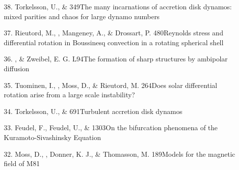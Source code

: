 \begin{itemize}
\item[38.]
Torkelsson, U., \& \Brandenburg{}
{349}{The many incarnations of accretion disk dynamos:
mixed parities and chaos for large dynamo numbers}

\item[37.]
Rieutord, M., \Brandenburg, Mangeney, A., \& Drossart, P.
{480}{Reynolds stress and differential rotation
in Boussinesq convection in a rotating spherical shell}

\item[36.]
\Brandenburg, \& Zweibel, E. G.
{L94}{The formation of sharp structures by ambipolar diffusion}

\item[35.]
Tuominen, I., \Brandenburg, Moss, D., \& Rieutord, M.
{264}{Does solar differential rotation arise from a large scale instability?}

\item[34.]
Torkelsson, U., \& \Brandenburg{}
{691}{Turbulent accretion disk dynamos}

\item[33.]
Feudel, F., Feudel, U., \& \Brandenburg{}
{1303}{On the bifurcation phenomena of the Kuramoto-Sivashinsky Equation}

\item[32.]
Moss, D., \Brandenburg, Donner, K. J., \& Thomasson, M.
{189}{Models for the magnetic field of M81}


\end{itemize}
